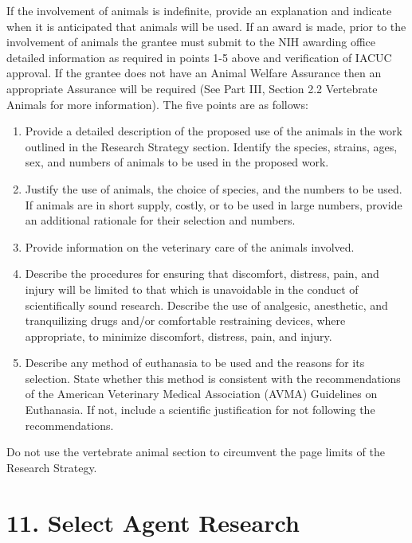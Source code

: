 \documentclass[11pt,notitlepage]{article}
\begin{document}
If the involvement of animals is indefinite, provide an explanation and indicate when it is anticipated that animals will be used. If an award is made, prior to the involvement of animals the grantee must submit to the NIH awarding office detailed information as required in points 1-5 above and verification of IACUC approval. If the grantee does not have an Animal Welfare Assurance then an appropriate Assurance will be required (See Part III, Section 2.2 Vertebrate Animals for more information).
The five points are as follows:

\begin{enumerate}
\item Provide a detailed description of the proposed use of the animals in the work outlined in the Research Strategy section. Identify the species, strains, ages, sex, and numbers of animals to be used in the proposed work.
\item Justify the use of animals, the choice of species, and the numbers to be used. If animals are in short supply, costly, or to be used in large numbers, provide an additional rationale for their selection and numbers.
\item Provide information on the veterinary care of the animals involved.
\item Describe the procedures for ensuring that discomfort, distress, pain, and injury will be limited to that which is unavoidable in the conduct of scientifically sound research. Describe the use of analgesic, anesthetic, and tranquilizing drugs and/or comfortable restraining devices, where appropriate, to minimize discomfort, distress, pain, and injury.
\item Describe any method of euthanasia to be used and the reasons for its selection. State whether this method is consistent with the recommendations of the American Veterinary Medical Association (AVMA) Guidelines on Euthanasia. If not, include a scientific justification for not following the recommendations.
\end{enumerate}

Do not use the vertebrate animal section to circumvent the page limits of the Research Strategy.


\newpage

\section*{11. Select Agent Research}
\end{document}
